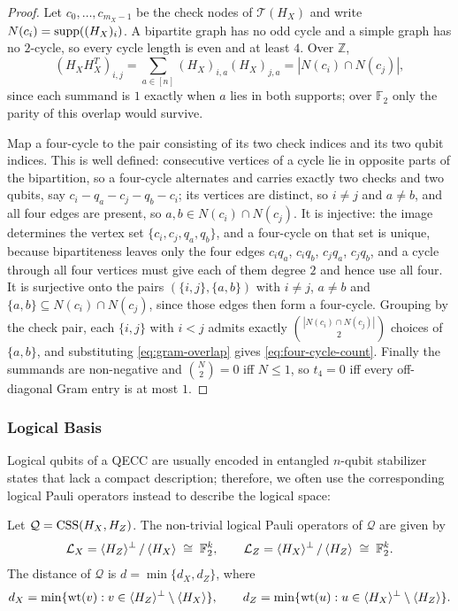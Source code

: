 \begin{proof}
Let $c_0,\dots,c_{m_X-1}$ be the check nodes of $\mathcal T(H_X)$ and write $N(c_i) = \mathrm{supp}((H_X)_i)$. A bipartite graph has no odd cycle and a simple graph has no $2$-cycle, so every cycle length is even and at least $4$. Over $\mathbb Z$,
\begin{equation}\label{eq:gram-overlap}
    (H_XH_X^T)_{i,j} = \sum_{a\in[n]}(H_X)_{i,a}(H_X)_{j,a} = |N(c_i)\cap N(c_j)|,
\end{equation}
since each summand is $1$ exactly when $a$ lies in both supports; over $\mathbb F_2$ only the parity of this overlap would survive.

Map a four-cycle to the pair consisting of its two check indices and its two qubit indices. This is well defined: consecutive vertices of a cycle lie in opposite parts of the bipartition, so a four-cycle alternates and carries exactly two checks and two qubits, say $c_i - q_a - c_j - q_b - c_i$; its vertices are distinct, so $i\neq j$ and $a\neq b$, and all four edges are present, so $a,b\in N(c_i)\cap N(c_j)$. It is injective: the image determines the vertex set $\{c_i,c_j,q_a,q_b\}$, and a four-cycle on that set is unique, because bipartiteness leaves only the four edges $c_iq_a$, $c_iq_b$, $c_jq_a$, $c_jq_b$, and a cycle through all four vertices must give each of them degree $2$ and hence use all four. It is surjective onto the pairs $(\{i,j\},\{a,b\})$ with $i\neq j$, $a\neq b$ and $\{a,b\}\subseteq N(c_i)\cap N(c_j)$, since those edges then form a four-cycle. Grouping by the check pair, each $\{i,j\}$ with $i<j$ admits exactly $\binom{|N(c_i)\cap N(c_j)|}{2}$ choices of $\{a,b\}$, and substituting \eqref{eq:gram-overlap} gives \eqref{eq:four-cycle-count}. Finally the summands are non-negative and $\binom N2 = 0$ iff $N\leq 1$, so $t_4 = 0$ iff every off-diagonal Gram entry is at most $1$.
\end{proof}

\subsubsection{Logical Basis}

Logical qubits of a QECC are usually encoded in entangled $n$-qubit stabilizer states that lack a compact description; therefore, we often use the corresponding logical Pauli operators instead to describe the logical space:

\begin{definition}\label{def:logicals}
Let $\mathcal Q = \mathrm{CSS}(H_X, H_Z)$. The non-trivial logical Pauli operators of $\mathcal{Q}$ are given by 
\begin{align*}
    \mathcal{L}_X = \langle H_Z \rangle^\perp\,/\,\langle H_X \rangle\;\cong\; \mathbb F_2^{k},\qquad
    \mathcal{L}_Z = \langle H_X \rangle^\perp\,/\,\langle H_Z \rangle\;\cong\; \mathbb F_2^{k}. 
\end{align*}
The distance of $\mathcal{Q}$ is $d = \min\{d_X, d_Z\}$, where
\begin{equation}\label{eq:css-distance}
    d_X = \min\{\mathrm{wt}(v): v \in \langle H_Z \rangle^\perp\setminus \langle H_X \rangle\},\qquad
    d_Z = \min\{\mathrm{wt}(u): u \in \langle H_X \rangle^\perp\setminus \langle H_Z \rangle\}.
\end{equation}
\end{definition}
 
